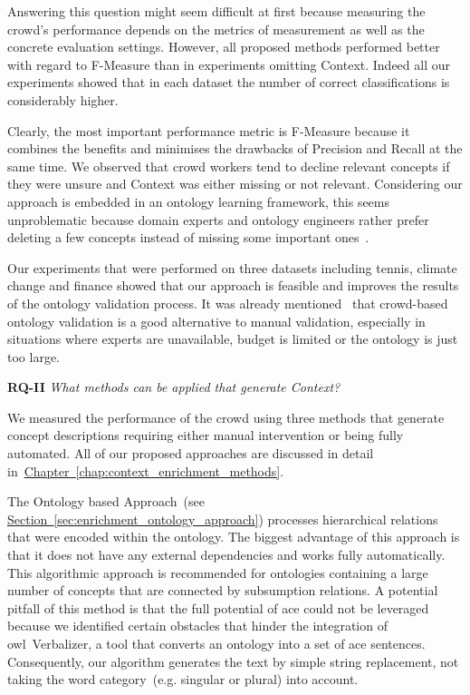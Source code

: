 Answering this question might seem difficult at first because measuring the crowd's performance depends on the metrics of measurement as well as the concrete evaluation settings. However, all proposed methods performed better with regard to F-Measure than in experiments omitting Context. Indeed all our experiments showed that in each dataset the number of correct classifications is considerably higher. 

Clearly, the most important performance metric is F-Measure because it combines the benefits and minimises the drawbacks of Precision and Recall at the same time. We observed that crowd workers tend to decline relevant concepts if they were unsure and Context was either missing or not relevant. Considering our approach is embedded in an ontology learning framework, this seems unproblematic because domain experts and ontology engineers rather prefer deleting a few concepts instead of missing some important ones~\cite{sabou2006}. 

Our experiments that were performed on three datasets including tennis, climate change and finance showed that our approach is feasible and improves the results of the ontology validation process. It was already mentioned~\cite{mortensen2015, mortensen2016, wohlgenannt2016} that crowd-based ontology validation is a good alternative to manual validation, especially in situations where experts are unavailable, budget is limited or the ontology is just too large. 

\textbf{RQ-II} \emph{What methods can be applied that generate Context?}

We measured the performance of the crowd using three methods that generate concept descriptions requiring either manual intervention or being fully automated. All of our proposed approaches are discussed in detail in~\hyperref[chap:context_enrichment_methods]{Chapter~\ref*{chap:context_enrichment_methods}}. 

The Ontology based Approach~(see \hyperref[sec:enrichment_ontology_approach]{Section~\ref*{sec:enrichment_ontology_approach}}) processes hierarchical relations that were encoded within the ontology. The biggest advantage of this approach is that it does not have any external dependencies and works fully automatically. This algorithmic approach is recommended for ontologies containing a large number of concepts that are connected by subsumption relations. A potential pitfall of this method is that the full potential of \gls{ace} could not be leveraged because we identified certain obstacles that hinder the integration of \gls{owl}~Verbalizer, a tool that converts an ontology into a set of \gls{ace} sentences. Consequently, our algorithm generates the text by simple string replacement, not taking the word category~(e.g. singular or plural) into account. 

